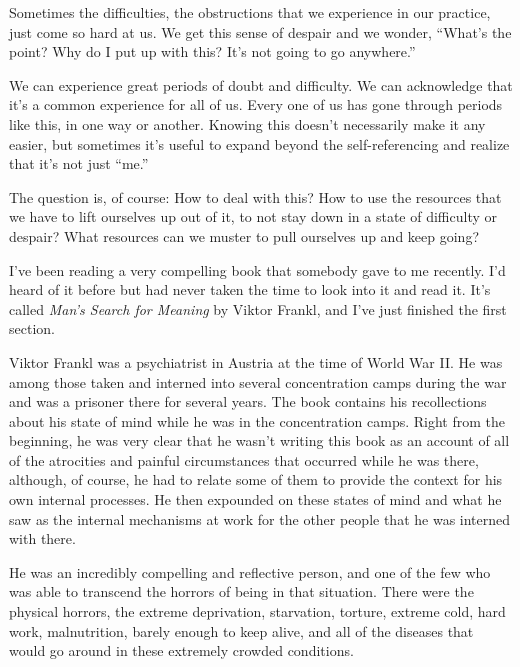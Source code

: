 Sometimes the difficulties, the obstructions that we experience in our practice, just come so hard at us. We get this sense of despair and we wonder, ``What's the point? Why do I put up with this? It's not going to go anywhere.''

We can experience great periods of doubt and difficulty. We can acknowledge that it's a common experience for all of us. Every one of us has gone through periods like this, in one way or another. Knowing this doesn't necessarily make it any easier, but sometimes it's useful to expand beyond the self-referencing and realize that it's not just ``me.''

The question is, of course: How to deal with this? How to use the resources that we have to lift ourselves up out of it, to not stay down in a state of difficulty or despair? What resources can we muster to pull ourselves up and keep going?

I've been reading a very compelling book that somebody gave to me recently. I'd heard of it before but had never taken the time to look into it and read it. It's called \emph{Man's Search for Meaning} by Viktor Frankl, and I've just finished the first section.

Viktor Frankl was a psychiatrist in Austria at the time of World War II. He was among those taken and interned into several concentration camps during the war and was a prisoner there for several years. The book contains his recollections about his state of mind while he was in the concentration camps. Right from the beginning, he was very clear that he wasn't writing this book as an account of all of the atrocities and painful circumstances that occurred while he was there, although, of course, he had to relate some of them to provide the context for his own internal processes. He then expounded on these states of mind and what he saw as the internal mechanisms at work for the other people that he was interned with there.

He was an incredibly compelling and reflective person, and one of the few who was able to transcend the horrors of being in that situation. There were the physical horrors, the extreme deprivation, starvation, torture, extreme cold, hard work, malnutrition, barely enough to keep alive, and all of the diseases that would go around in these extremely crowded conditions.


